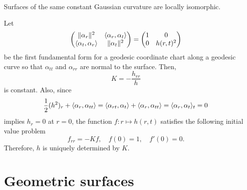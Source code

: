 \documentclass{../../large}
\begin{document}
\begin{prb}
Surfaces of the same constant Gaussian curvature are locally isomorphic.
\end{prb}
\begin{pf}
Let
\[\begin{pmatrix}\|\alpha_r\|^2&\langle\alpha_r,\alpha_t\rangle\\\langle\alpha_t,\alpha_r\rangle&\|\alpha_t\|^2\end{pmatrix}=\begin{pmatrix}1&0\\0&h(r,t)^2\end{pmatrix}\]
be the first fundamental form for a geodesic coordinate chart along a geodesic curve so that $\alpha_{tt}$ and $\alpha_{rr}$ are normal to the surface.
Then,
\[K=-\frac{h_{rr}}h\]
is constant.
Also, since
\[\frac12(h^2)_r+\langle\alpha_r,\alpha_{tt}\rangle=\langle\alpha_{rt},\alpha_t\rangle+\langle\alpha_r,\alpha_{tt}\rangle=\langle\alpha_r,\alpha_t\rangle_t=0\]
implies $h_r=0$ at $r=0$, the function $f:r\mapsto h(r,t)$ satisfies the following initial value problem
\[f_{rr}=-Kf,\quad f(0)=1,\quad f'(0)=0.\]
Therefore, $h$ is uniquely determined by $K$.
\end{pf}








\chapter{Geometric surfaces}

\section{}
\end{document}
